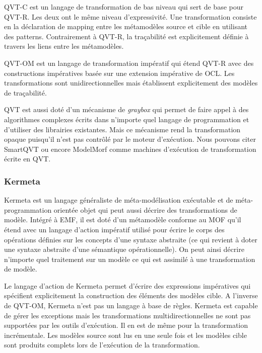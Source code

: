 QVT-C est un langage de transformation de bas niveau qui sert de base pour 
QVT-R. Les deux ont le même niveau d'expressivité. Une transformation consiste 
en la déclaration de mapping entre les métamodèles source et cible en utilisant 
des patterns. Contrairement à QVT-R, la traçabilité est explicitement définie à 
travers les liens entre les métamodèles.

QVT-OM est un langage de transformation impératif qui étend QVT-R avec des 
constructions impératives basée sur une extension impérative de OCL. Les 
transformations sont unidirectionnelles mais établissent explicitement des 
modèles de traçabilité.

QVT est aussi doté d'un mécanisme de \textit{graybox} qui permet de faire appel 
à des algorithmes complexes écrits dans n'importe quel langage de programmation 
et d'utiliser des librairies existantes. Mais ce mécanisme rend la 
transformation opaque puisqu'il n'est pas contrôlé par le moteur d'exécution. 
Nous pouvons citer SmartQVT ou encore ModelMorf comme machines d'exécution de 
transformation écrite en QVT.

\subsubsection{Kermeta}
Kermeta est un langage généraliste de méta-modélisation exécutable et de 
méta-programmation orientée objet qui peut aussi décrire des transformations de 
modèle. Intégré à EMF, il est doté d'un métamodèle conforme au MOF qu'il étend 
avec un langage d'action impératif utilisé pour écrire le corps des opérations 
définies sur les concepts d'une syntaxe abstraite (ce qui revient à doter une 
syntaxe abstraite d'une sémantique opérationnelle). On peut ainsi décrire 
n'importe quel traitement sur un modèle ce qui est assimilé à une transformation 
de modèle.

Le langage d'action de Kermeta permet d'écrire des expressions impératives qui 
spécifient explicitement la construction des éléments des modèles cible. A 
l'inverse de QVT-OM, Kermeta n'est pas un langage à base de règles.  
Kermeta est capable de gérer les exceptions mais les transformations 
multidirectionnelles ne sont pas supportées par les outils d'exécution. Il en 
est de même pour la transformation incrémentale. Les modèles source sont lus en 
une seule fois et les modèles cible sont produits complets lors de l'exécution 
de la transformation.




